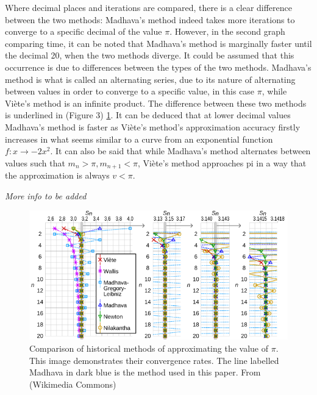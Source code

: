 Where decimal places and iterations are compared, there is a clear difference between the two
methods: Madhava's method indeed takes more iterations to converge to a specific decimal of
the value $\pi$. However, in the second graph comparing time, it can be noted that Madhava's
method is marginally faster until the decimal 20, when the two methods diverge. It could be
assumed that this occurrence is due to differences between the types of the two methods. Madhava's
method is what is called an alternating series, due to its nature of alternating between values in order
to converge to a specific value, in this case $\pi$, while Viète's method is an infinite product. The
difference between these two methods is underlined in (Figure 3) \ref{fig:comparaison}. It can be
deduced that at lower decimal values Madhava's method is faster as Viète's method's approximation
accuracy firstly increases in what seems similar to a curve from an exponential function $f : x \to -2x^2$.
It can also be said that while Madhava's method alternates between values such that $m_{n} > \pi, m_{n+1} < \pi$,
Viète's method approaches pi in a way that the approximation is always $v < \pi$.

\textit{More info to be added}


\begin{figure}[h]
    \includegraphics[width=\linewidth]{image.png}
    \caption{Comparison of historical methods of approximating the value of $\pi$. This image demonstrates
        their convergence rates. The line labelled Madhava in dark blue is the method used in this paper.
        From (Wikimedia Commons) \cite{infinite_series_comparaison}}
    \label{fig:comparaison}
\end{figure}
